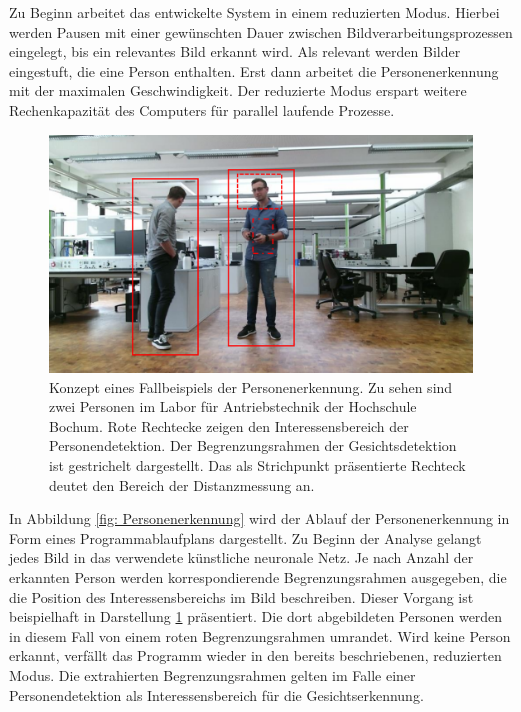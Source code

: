 	Zu Beginn arbeitet das entwickelte System in einem reduzierten Modus. Hierbei werden Pausen mit einer gewünschten Dauer zwischen Bildverarbeitungsprozessen eingelegt, bis ein relevantes Bild erkannt wird. Als relevant werden Bilder eingestuft, die eine Person enthalten. Erst dann arbeitet die Personenerkennung mit der maximalen Geschwindigkeit. Der reduzierte Modus erspart weitere Rechenkapazität des Computers für parallel laufende Prozesse. 
		

	
	
	\begin{figure}[H]
		\centering
		\includegraphics[width=1\textwidth]{Bilder/person.pdf}
		\caption{Konzept eines Fallbeispiels der Personenerkennung. Zu sehen sind zwei Personen im Labor für Antriebstechnik der Hochschule Bochum. Rote Rechtecke zeigen den Interessensbereich der Personendetektion. Der Begrenzungsrahmen der Gesichtsdetektion ist gestrichelt dargestellt. Das als Strichpunkt präsentierte Rechteck deutet den Bereich der Distanzmessung an.}
		\label{fig: bbox}
	\end{figure}
		In Abbildung \ref{fig: Personenerkennung} wird der Ablauf der Personenerkennung in Form eines Programmablaufplans dargestellt. Zu Beginn der Analyse gelangt jedes Bild in das verwendete künstliche neuronale Netz. Je nach Anzahl der erkannten Person werden korrespondierende Begrenzungsrahmen ausgegeben, die die Position des Interessensbereichs im Bild beschreiben. Dieser Vorgang ist beispielhaft in Darstellung \ref{fig: bbox} präsentiert. Die dort abgebildeten Personen werden in diesem Fall von einem roten Begrenzungsrahmen umrandet. Wird keine Person erkannt, verfällt das Programm wieder in den bereits beschriebenen, reduzierten Modus. Die extrahierten Begrenzungsrahmen gelten im Falle einer Personendetektion als Interessensbereich für die Gesichtserkennung.\\
		
